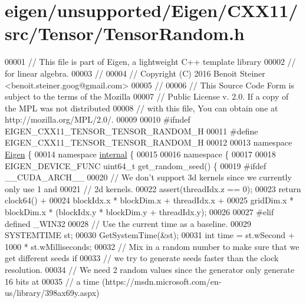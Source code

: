 \hypertarget{eigen_2unsupported_2_eigen_2_c_x_x11_2src_2_tensor_2_tensor_random_8h_source}{}\section{eigen/unsupported/\+Eigen/\+C\+X\+X11/src/\+Tensor/\+Tensor\+Random.h}
\label{eigen_2unsupported_2_eigen_2_c_x_x11_2src_2_tensor_2_tensor_random_8h_source}

\begin{DoxyCode}
00001 \textcolor{comment}{// This file is part of Eigen, a lightweight C++ template library}
00002 \textcolor{comment}{// for linear algebra.}
00003 \textcolor{comment}{//}
00004 \textcolor{comment}{// Copyright (C) 2016 Benoit Steiner <benoit.steiner.goog@gmail.com>}
00005 \textcolor{comment}{//}
00006 \textcolor{comment}{// This Source Code Form is subject to the terms of the Mozilla}
00007 \textcolor{comment}{// Public License v. 2.0. If a copy of the MPL was not distributed}
00008 \textcolor{comment}{// with this file, You can obtain one at http://mozilla.org/MPL/2.0/.}
00009 
00010 \textcolor{preprocessor}{#ifndef EIGEN\_CXX11\_TENSOR\_TENSOR\_RANDOM\_H}
00011 \textcolor{preprocessor}{#define EIGEN\_CXX11\_TENSOR\_TENSOR\_RANDOM\_H}
00012 
00013 \textcolor{keyword}{namespace }\hyperlink{namespace_eigen}{Eigen} \{
00014 \textcolor{keyword}{namespace }\hyperlink{namespaceinternal}{internal} \{
00015 
00016 \textcolor{keyword}{namespace }\{
00017 
00018 EIGEN\_DEVICE\_FUNC uint64\_t get\_random\_seed() \{
00019 \textcolor{preprocessor}{#ifdef \_\_CUDA\_ARCH\_\_}
00020   \textcolor{comment}{// We don't support 3d kernels since we currently only use 1 and}
00021   \textcolor{comment}{// 2d kernels.}
00022   assert(threadIdx.z == 0);
00023   \textcolor{keywordflow}{return} clock64() +
00024       blockIdx.x * blockDim.x + threadIdx.x +
00025       gridDim.x * blockDim.x * (blockIdx.y * blockDim.y + threadIdx.y);
00026 
00027 \textcolor{preprocessor}{#elif defined \_WIN32}
00028   \textcolor{comment}{// Use the current time as a baseline.}
00029   SYSTEMTIME st;
00030   GetSystemTime(&st);
00031   \textcolor{keywordtype}{int} time = st.wSecond + 1000 * st.wMilliseconds;
00032   \textcolor{comment}{// Mix in a random number to make sure that we get different seeds if}
00033   \textcolor{comment}{// we try to generate seeds faster than the clock resolution.}
00034   \textcolor{comment}{// We need 2 random values since the generator only generate 16 bits at}
00035   \textcolor{comment}{// a time (https://msdn.microsoft.com/en-us/library/398ax69y.aspx)}

\end{DoxyCode}
